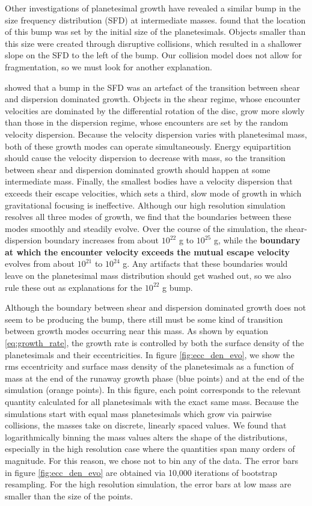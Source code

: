 Other investigations of planetesimal growth have revealed a similar bump in the size frequency distribution (SFD) at intermediate 
masses. \cite{morbidelli09} found that the location of this bump was set by the initial size of the planetesimals. Objects smaller 
than this size were created through disruptive collisions, which resulted in a shallower slope on the SFD to the left of the bump. 
Our collision model does not allow for fragmentation, so we must look for another explanation.

\cite{weidenschilling11} showed that a bump in the SFD was an artefact of the transition between shear and dispersion dominated 
growth. Objects in the shear regime, whose encounter velocities are dominated by the differential rotation of the disc, grow more 
slowly than those in the dispersion regime, whose encounters are set by the random velocity dispersion. Because the velocity 
dispersion varies with planetesimal mass, both of these growth modes can operate simultaneously. Energy equipartition should 
cause the velocity dispersion to decrease with mass, so the transition between shear and dispersion dominated growth should 
happen at some intermediate mass. Finally, the smallest bodies have a velocity dispersion that exceeds their escape velocities, 
which sets a third, slow mode of growth in which gravitational focusing is ineffective. Although our high resolution simulation 
resolves all three modes of growth, we find that the boundaries between these modes smoothly and steadily evolve. Over the 
course of the simulation, the shear-dispersion boundary increases from about $10^{22}$ g to $10^{25}$ g, while the \textbf{boundary at which the encounter velocity exceeds the mutual escape velocity} evolves from about $10^{21}$ to $10^{24}$ g. Any artifacts that these boundaries would leave on the 
planetesimal mass distribution should get washed out, so we also rule these out as explanations for the $10^{22}$ g bump.

Although the boundary between shear and dispersion dominated growth does not seem to be producing the bump, there still 
must be some kind of transition between growth modes occurring near this mass. As shown by equation \ref{eq:growth_rate}, 
the growth rate is controlled by both the surface density of the planetesimals and their eccentricities. In figure 
\ref{fig:ecc_den_evo}, we show the rms eccentricity and surface mass density of the planetesimals as a function of mass at the 
end of the runaway growth phase (blue points) and at the end of the simulation (orange points). In this figure, each point 
corresponds to the relevant quantity calculated for all planetesimals with the exact same mass. Because the simulations start 
with equal mass planetesimals which grow via pairwise collisions, the masses take on discrete, linearly spaced values. We found 
that logarithmically binning the mass values alters the shape of the distributions, especially in the high resolution case where the 
quantities span many orders of magnitude. For this reason, we chose not to bin any of the data. The error bars in figure 
\ref{fig:ecc_den_evo} are obtained via 10,000 iterations of bootstrap resampling. For the high resolution simulation, the error 
bars at low mass are smaller than the size of the points.

